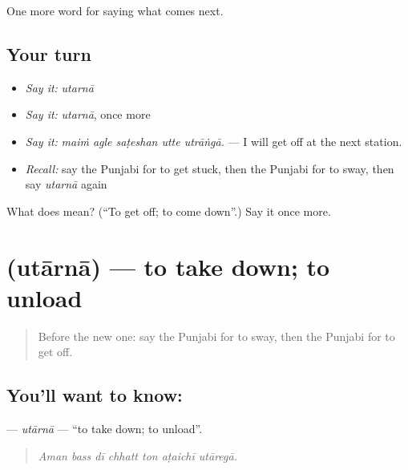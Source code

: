\begin{grammarlens}[title={What you've built}]
One more word for saying what comes next.
\end{grammarlens}

\subsection*{Your turn}
\begin{itemize}
\raggedright
  \item \emph{Say it:} \emph{utarnā}
  \item \emph{Say it:} \emph{utarnā}, once more
  \item \emph{Say it:} \emph{maiṁ agle saṭeshan utte utrāṅgā.} — I will get off at the next station.
  \item \emph{Recall:} say the Punjabi for to get stuck, then the Punjabi for to sway, then say \emph{utarnā} again
\end{itemize}

\begin{tcolorbox}[breakable,colback=teal!4,colframe=teal!35!black,title={Before you move on}]
What does  mean? (\textquotedblleft{}To get off; to come down\textquotedblright{}.) Say it once more.
\end{tcolorbox}
\section[\texorpdfstring{\pa{ਉਤਾਰਨਾ} (utārnā)}{ਉਤਾਰਨਾ (utārnā)}]{ (utārnā) — to take down; to unload}

\label{lesson:PA-C284-utaarna}



\begin{quote}
Before the new one: say the Punjabi for to sway, then the Punjabi for to get off.
\end{quote}

\subsection*{You'll want to know: }
\textbf{} — \emph{utārnā} — \textquotedblleft{}to take down; to unload\textquotedblright{}.

\begin{quote}
      
\end{quote}

\begin{quote}
\emph{Aman bass dī chhatt ton aṭaichī utāregā.}
\end{quote}

